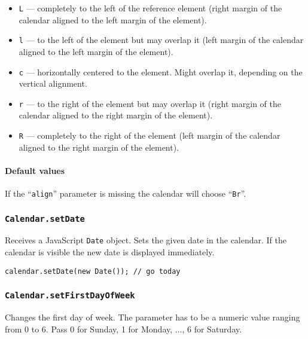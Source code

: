 \documentclass[a4paper,twoside,10pt]{dynadoc}
\begin{document}
\begin{itemize}

\item \texttt{L} --- completely to the left of the reference element (right
margin of the calendar aligned to the left margin of the element).

\item \texttt{l} --- to the left of the element but may overlap it (left margin
of the calendar aligned to the left margin of the element).

\item \texttt{c} --- horizontally centered to the element.  Might overlap it,
depending on the vertical alignment.

\item \texttt{r} --- to the right of the element but may overlap it (right
margin of the calendar aligned to the right margin of the element).

\item \texttt{R} --- completely to the right of the element (left margin of the
calendar aligned to the right margin of the element).

\end{itemize}

\paragraph{Default values}
If the ``\texttt{align}'' parameter is missing the calendar will choose
``\texttt{Br}''.

\subsubsection{\texttt{Calendar.setDate}}\label{sec:Calendar.setDate}

Receives a JavaScript \texttt{Date} object.  Sets the given date in the
calendar.  If the calendar is visible the new date is displayed immediately.

\begin{verbatim}
calendar.setDate(new Date()); // go today
\end{verbatim}

\subsubsection{\texttt{Calendar.setFirstDayOfWeek}}\label{sec:Calendar.setFirstDayOfWeek}

Changes the first day of week.  The parameter has to be a numeric value ranging
from 0 to 6.  Pass 0 for Sunday, 1 for Monday, ..., 6 for Saturday.
\end{document}
